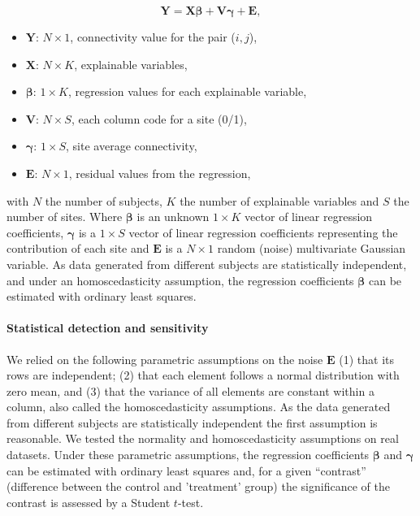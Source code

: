 \documentclass[authoryear]{elsarticle}
\begin{document}
\begin{equation}
\label{eq_glm_dummy}
 \mathbf{Y} = \mathbf{X}\mathbf{\beta} + \mathbf{V}\mathbf{\gamma}+ \mathbf{E},
\end{equation}
\begin{itemize}
 \item $\mathbf{Y}$: $N\times 1$, connectivity value for the pair ($i,j$),
 \item $\mathbf{X}$: $N\times K$, explainable variables,
 \item $\mathbf{\beta}$: $1 \times K$, regression values for each explainable variable,
 \item $\mathbf{V}$: $N\times S$, each column code for a site (0/1),
 \item $\mathbf{\gamma}$: $1\times S$, site average connectivity,
 \item $\mathbf{E}$: $N\times 1$, residual values from the regression,
\end{itemize}
with $N$ the number of subjects, $K$ the number of explainable variables and $S$ the number of sites. Where $\mathbf{\beta}$ is an unknown $1\times K$ vector of linear regression coefficients, $\mathbf{\gamma}$ is a $1\times S$ vector of linear regression coefficients representing the contribution of each site and $\mathbf{E}$ is a $N\times 1$ random (noise) multivariate Gaussian variable. As data generated from different subjects are statistically independent, and under an homoscedasticity assumption, the regression coefficients $\mathbf{\beta}$ can be estimated with ordinary least squares.

\paragraph{Statistical detection and sensitivity}
We relied on the following parametric assumptions on the noise $\mathbf{E}$ (1) that its rows are independent; (2) that each element follows a normal distribution with zero mean, and (3) that the variance of all elements are constant within a column, also called the homoscedasticity assumptions. As the data generated from different subjects are statistically independent the first assumption is reasonable. We tested the normality and homoscedasticity assumptions on real datasets. Under these parametric assumptions, the regression coefficients $\mathbf{\beta}$ and $\mathbf{\gamma}$ can be estimated with ordinary least squares and, for a given “contrast” (difference between the control and 'treatment' group) the significance of the contrast is assessed by a Student $t$-test.
\end{document}
